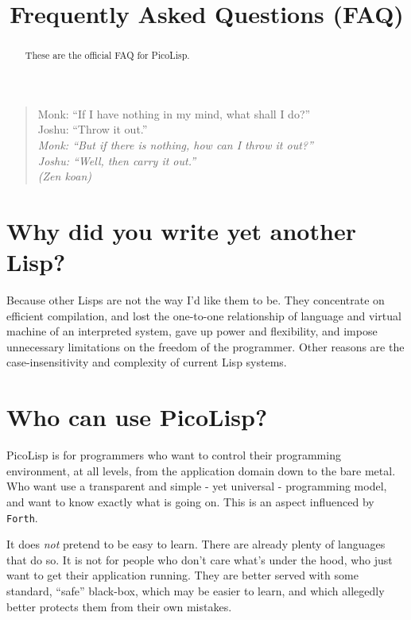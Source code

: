 \title{Frequently Asked Questions (FAQ)}

\maketitle

\begin{quote}
  \begin{flushleft}
   Monk: ``If I have nothing in my mind, what shall I do?''\\
   Joshu: ``Throw it out.''\\
    \emph{Monk: ``But if there is nothing, how can I throw it out?''\\
    Joshu: ``Well, then carry it out.''\\ (Zen koan)}
  \end{flushleft}
\end{quote}

\begin{abstract}
These are the official FAQ for PicoLisp. 
\end{abstract}

\section{Why did you write yet another Lisp?}
\label{sec:faq-why-did-you-write-yet-another-lisp?}


Because other Lisps are not the way I'd like them to be. They
concentrate on efficient compilation, and lost the one-to-one
relationship of language and virtual machine of an interpreted system,
gave up power and flexibility, and impose unnecessary limitations on the
freedom of the programmer. Other reasons are the case-insensitivity and
complexity of current Lisp systems.

 
\section{Who can use PicoLisp?}
\label{sec:faq-who-can-use-picolisp?}


PicoLisp is for programmers who want to control their programming
environment, at all levels, from the application domain down to the bare
metal. Who want use a transparent and simple - yet universal -
programming model, and want to know exactly what is going on. This is an
aspect influenced by \texttt{Forth}.

It does \emph{not} pretend to be easy to learn. There are already plenty of
languages that do so. It is not for people who don't care what's under
the hood, who just want to get their application running. They are
better served with some standard, ``safe'' black-box, which may be easier
to learn, and which allegedly better protects them from their own
mistakes.

